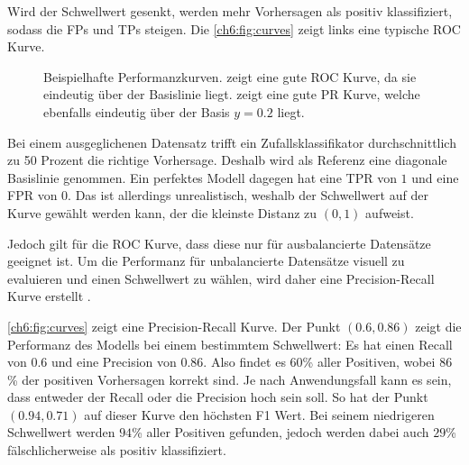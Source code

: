 Wird der Schwellwert gesenkt, werden mehr Vorhersagen als positiv klassifiziert, sodass die FPs und TPs steigen.
Die \autoref{ch6:fig:curves} zeigt links eine typische ROC Kurve.

\begin{figure}[ht]
    \centering
    \caption[Beispielhafte ROC / PR Kurven]{Beispielhafte Performanzkurven.
     zeigt eine gute ROC Kurve, da sie eindeutig über der Basislinie liegt.
     zeigt eine gute PR Kurve, welche ebenfalls eindeutig über der Basis $y=0.2$ liegt. }
    \label{ch6:fig:curves}
\end{figure}

Bei einem ausgeglichenen Datensatz trifft ein Zufallsklassifikator durchschnittlich zu 50 Prozent die richtige Vorhersage.
Deshalb wird als Referenz eine diagonale Basislinie genommen.
Ein perfektes Modell dagegen hat eine \ac{TPR} von $1$ und eine \ac{FPR} von $0$.
Das ist allerdings unrealistisch, weshalb der Schwellwert auf der Kurve gewählt werden kann, der die kleinste Distanz zu $(0,1)$ aufweist.

\bigskip
Jedoch gilt für die ROC Kurve, dass diese nur für ausbalancierte Datensätze geeignet ist.
Um die Performanz für unbalancierte Datensätze visuell zu evaluieren und einen Schwellwert zu wählen, wird daher eine Precision-Recall Kurve erstellt \cite{saito_precision-recall_2015}.

\autoref{ch6:fig:curves} zeigt eine Precision-Recall Kurve.
Der Punkt $(0.6, 0.86)$ zeigt die Performanz des Modells bei einem bestimmtem Schwellwert: Es hat einen Recall von $0.6$ und eine Precision von $0.86$.
Also findet es $60$\% aller Positiven, wobei $86$\% der positiven Vorhersagen korrekt sind.
Je nach Anwendungsfall kann es sein, dass entweder der Recall oder die Precision hoch sein soll.
So hat der Punkt $(0.94, 0.71)$ auf dieser Kurve den höchsten F1 Wert.
Bei seinem niedrigeren Schwellwert werden $94$\% aller Positiven gefunden, jedoch werden dabei auch $29$\% fälschlicherweise als positiv klassifiziert.

